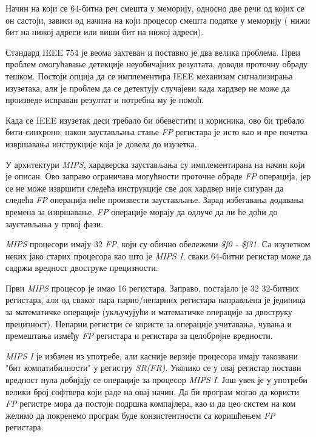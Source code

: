 \documentclass[12pt,oneside]{memoir}
\begin{document}
\indent Начин на који се 64-битна реч смешта у меморију, односно две речи од којих се он састоји, зависи од начина на који процесор смешта податке у меморију ( нижи бит на нижој адреси или виши бит на нижој адреси). 

\indent Стандард IEEE 754 је веома захтеван и поставио је два велика проблема. Први проблем омогућавање детекције неуобичајних резултата, доводи проточну обраду тешком. Постоји опција да се имплементира IEEE механизам сигнализирања изузетака, али је проблем да се детектују случајеви када хардвер не може да произведе исправан резултат и потребна му је помоћ.

\indent Када се IEEE изузетак деси требало би обевестити и корисника, ово би требало бити синхроно; након заустављања стање \textit{FP} регистара је исто као и пре почетка извршавања инструкције која је довела до изузетка.

\indent У архитектури \textit{MIPS}, хардверска заустављања су имплементирана на начин који је описан. Ово заправо ограничава могућности проточне обраде \textit{FP} операција, јер се не може извршити следећа инструкције све док хардвер није сигуран да следећа \textit{FP} операција неће произвести заустављање. Зарад избегавања додавања времена за извршавање, \textit{FP} операције морају да одлуче да ли ће доћи до заустављања у првој фази. 

\indent \textit{MIPS} процесори имају 32 \textit{FP}, који су обично обележени \textit{\$f0 - \$f31}. Са изузетком неких јако старих процесора као што је \textit{MIPS I}, сваки 64-битни регистар може да садржи вредност двоструке прецизности.

\indent Први \textit{MIPS} процесор је имао 16 регистара. Заправо, постајало је 32 32-битних регистара, али од сваког пара парно/непарних регистара направљена је јединица за математичке операције (укључујући и математичке операције за двоструку прецизност). Непарни регистри се користе за операције учитавања, чувања и премештања између \textit{FP} регистара и регистара за целобројне вредности.

\indent \textit{MIPS I} је избачен из употребе, али касније верзије процесора имају такозвани "бит компатибилности" у регистру \textit{SR(FR)}. Уколико се у овај регистар постави вредност нула добијају се операције за процесор \textit{MIPS I}. Још увек је у употреби велики број софтвера који раде на овај начин. Да би програм могао да користи \textit{FP} регистре мора да постоји подршка компајлера, као и да цео систем на ком желимо да покренемо програм буде конзистентности са коришћењем \textit{FP} регистара.
\end{document}

